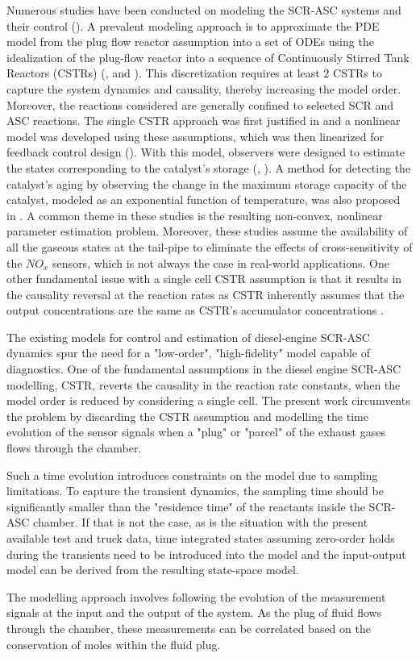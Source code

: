 Numerous studies have been conducted on modeling the SCR-ASC systems and their control (\cite{yuan2015diesel}). A
prevalent modeling approach is to approximate the PDE model from the plug flow reactor assumption into a set of ODEs
using the idealization of the plug-flow reactor into a sequence of Continuously Stirred Tank Reactors (CSTRs)
(\cite{hsieh2011development}, and \cite{nova2014urea}). This discretization requires at least 2 CSTRs to capture the
system dynamics and causality, thereby increasing the model order. Moreover, the reactions considered are generally
confined to selected SCR and ASC reactions. The single CSTR approach was first justified in
\cite{devarakonda2008adequacy} and a nonlinear model was developed using these assumptions, which was then linearized
for feedback control design (\cite{devarakonda2009model}). With this model, observers were designed to estimate the
states corresponding to the catalyst's storage (\cite{ma2017observer}, \cite{jain2020term}). A method for detecting the
catalyst's aging by observing the change in the maximum storage capacity of the catalyst, modeled as an exponential
function of temperature, was also proposed in \cite{ma2017observer}. A common theme in these studies is the resulting
non-convex, nonlinear parameter estimation problem. Moreover, these studies assume the availability of all the gaseous
states at the tail-pipe to eliminate the effects of cross-sensitivity of the $NO_x$ sensors, which is not always the
case in real-world applications. One other fundamental issue with a single cell CSTR assumption is that it results in
the causality reversal at the reaction rates as CSTR inherently assumes that the output concentrations are the same as
CSTR's accumulator concentrations \cite{charla2024reduced}.

The existing models for control and estimation of diesel-engine SCR-ASC dynamics spur the need for a "low-order",
"high-fidelity" model capable of diagnostics. One of the fundamental assumptions in the diesel engine SCR-ASC modelling,
CSTR, reverts the causality in the reaction rate constants, when the model order is reduced by considering a single
cell. The present work circumvents the problem by discarding the CSTR assumption and modelling the time evolution of the
sensor signals when a "plug" or "parcel" of the exhaust gases flows through the chamber.

Such a time evolution introduces constraints on the model due to sampling limitations. To capture the transient
dynamics, the sampling time should be significantly smaller than the "residence time" of the reactants inside the
SCR-ASC chamber. If that is not the case, as is the situation with the present available test and truck data, time
integrated states assuming zero-order holds during the transients need to be introduced into the model and the
input-output model can be derived from the resulting state-space model.

The modelling approach involves following the evolution of the measurement signals at the input and the output of the
system. As the plug of fluid flows through the chamber, these measurements can be correlated based on the conservation
of moles within the fluid plug.
